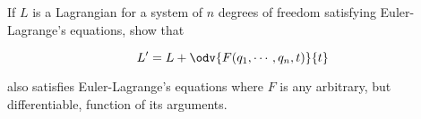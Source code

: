 \documentclass[../main.tex]{subfiles}
\begin{document}
\begin{problema}
	If \(L\) is a Lagrangian for a system of \(n\) degrees of freedom satisfying
	Euler-Lagrange's equations, show that

	\begin{equation*}
		L^{\prime} = L + \odv{F(q_{1}, \cdots, q_{n}, t)}{t}
	\end{equation*}

	also satisfies Euler-Lagrange's equations where \(F\) is any arbitrary,
	but differentiable, function of its arguments.
\end{problema}
\end{document}
